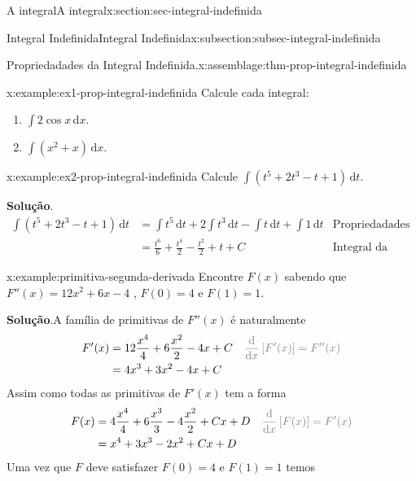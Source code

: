 \documentclass[oneside,10pt,]{article}
\newcommand{\blocktitlefont}{\relax}
\numberwithin{equation}{section}
\newcommand{\dd}{\mathrm{d}}
\newcommand{\integral}[2]{\displaystyle\int {#1}\,\dd {#2}}
\newcommand{\amp}{&}
\begin{document}
\begin{sectionptx}{A integral}{}{A integral}{}{}{x:section:sec-integral-indefinida}
\begin{subsectionptx}{Integral Indefinida}{}{Integral Indefinida}{}{}{x:subsection:subsec-integral-indefinida}
\begin{assemblage}{Propriedadades da Integral Indefinida.}{x:assemblage:thm-prop-integral-indefinida}
\begin{enumerate}[label=\Roman*)]
\end{enumerate}
%
\end{assemblage}
\begin{example}{}{x:example:ex1-prop-integral-indefinida}%
Calcule cada integral: \begin{enumerate}[font=\bfseries,label=(\alph*),ref=\alph*]
\item{}\(\integral{2\cos{x}}{x}\).%
 \item{}\(\integral{(x^2+x)}{x}\).%
\end{enumerate}
%
\end{example}
\begin{example}{}{x:example:ex2-prop-integral-indefinida}%
Calcule \(\integral{(t^5 + 2t^3 - t + 1)}{t}\).%
\par\smallskip%
\noindent\textbf{\blocktitlefont Solução}.\hypertarget{g:solution:idp24}{}\quad{}%
\begin{align*}
\integral{(t^5 + 2t^3 - t + 1)}{t}\amp = 
\integral{t^5}{t} + 2\integral{t^3}{t} - \integral{t}{t} +
\integral{1}{t}
\amp \hyperref[x:assemblage:thm-prop-integral-indefinida]{\text{Propriedadades da Integral Indefinida}} \\
\amp = \frac{t^{6}}{6}  + \frac{t^{4}}{2} - \frac{t^{2} }{2}  + t + C \amp \hyperref[x:assemblage:prob-integral-funcao-potencia]{\text{Integral da função potência}}
\end{align*}
%
\end{example}
\begin{example}{}{x:example:primitiva-segunda-derivada}%
Encontre \(F(x)\) sabendo que \(F''(x)=12x^2+6x-4\) , \(F(0)=4\) e \(F(1)=1\).%
\par\smallskip%
\noindent\textbf{\blocktitlefont Solução}.\hypertarget{g:solution:idp25}{}\quad{}A família de primitivas de \(F''(x)\) é naturalmente%
\begin{align*}
F'(x) \amp = 12\frac{x^4}{4} + 6\frac{x^2}{2} -4x+ C \amp  \color{gray}{\frac{\dd}{\dd x}\left[F'(x)\right]=F''(x)} \\
\amp =4x^3 + 3x^2-4x+C 
\end{align*}
Assim como todas as primitivas de \(F'(x)\) tem a forma%
\begin{align*}
F(x)\amp = 4\frac{x^4}{4} + 6\frac{x^3}{3} -4\frac{x^2}{2} + Cx + D \amp \color{gray}{\frac{\dd}{\dd x}\left[F(x)\right]=F'(x)} \\
\amp = x^4 + 3x^3-2x^2+Cx+D 
\end{align*}
Uma vez que \(F\) deve satisfazer \(F(0)=4\) e \(F(1)=1\) temos%
\begin{align*}

\end{align*}
\end{example}
\end{subsectionptx}
\end{sectionptx}
\end{document}
